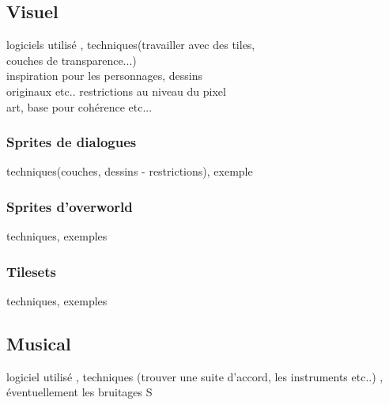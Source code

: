 \documentclass[11pt]{article}
\begin{document}
\subsection{Visuel}
logiciels utilisé , techniques(travailler avec des tiles, \\ couches de transparence...)\\ inspiration pour les personnages, dessins\\ originaux etc.. restrictions au niveau du pixel\\ art, base pour cohérence etc...
\subsubsection{Sprites de dialogues}
techniques(couches, dessins - restrictions), exemple 
\subsubsection{Sprites d'overworld}
techniques, exemples
\subsubsection{Tilesets}
techniques, exemples
\subsection{Musical}
logiciel utilisé , techniques (trouver une suite d'accord, les instruments etc..) , éventuellement les bruitages 
S
\end{document}
